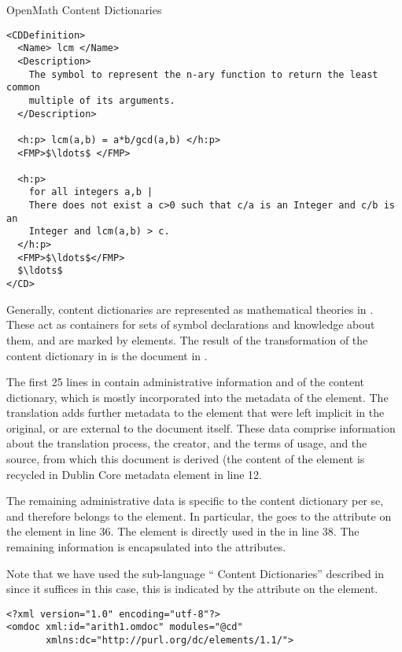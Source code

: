 \begin{omgroup}[id=omcds]{OpenMath Content Dictionaries}
\begin{lstlisting}[language=omCD,label=lst:omcd,mathescape,
    caption={Part of the {\openmath} content dictionary {\snippet{arith1.ocd}}}]
  <CDDefinition>
  <Name> lcm </Name>
  <Description> 
    The symbol to represent the n-ary function to return the least common
    multiple of its arguments.
  </Description>

  <h:p> lcm(a,b) = a*b/gcd(a,b) </h:p>
  <FMP>$\ldots$ </FMP>

  <h:p>
    for all integers a,b |
    There does not exist a c>0 such that c/a is an Integer and c/b is an
    Integer and lcm(a,b) > c.
  </h:p>
  <FMP>$\ldots$</FMP>
  $\ldots$
</CD>
\end{lstlisting}

\noindent Generally, {\openmath} content dictionaries are
represented as mathematical theories in {\omdoc}. These act as
containers for sets of symbol declarations and knowledge about them,
and are marked by {} elements. The result of the
transformation of the content dictionary in {} is the
{\omdoc} document in {}.

The first 25 lines in {} contain administrative information and
{} of the content dictionary, which is mostly incorporated into
the metadata of the {} element. The translation adds further
metadata to the {} element that were left implicit in the original,
or are external to the document itself. These data comprise information about the
translation process, the creator, and the terms of usage, and the source, from
which this document is derived (the content of the {} element is
recycled in Dublin Core metadata element {} in line 12.

The remaining administrative data is specific to the content dictionary per se, and
therefore belongs to the {} element. In particular, the
{} goes to the {} attribute on the
{} element in line 36. The {} element is
directly used in the {} in line 38.  The remaining information is
encapsulated into the {} attributes.

Note that we have used the {\omdoc} sub-language ``{\omdoc} Content Dictionaries''
described in {} since it suffices in this case, this is
indicated by the {} attribute on the {} element.

\begin{lstlisting}[label=lst:omdoccd,escapechar=\|,mathescape,
    caption={The {\openmath} content dictionary {\snippet{arith1}} in {\omdoc} form},
    index={DOCTYPE,omdoc,metadata,dc:title,dc:creator,dc:date,dc:description,dc:source,dc:type,dc:format,theory
           omtext,h:p}]
<?xml version="1.0" encoding="utf-8"?>
<omdoc xml:id="arith1.omdoc" modules="@cd"
       xmlns:dc="http://purl.org/dc/elements/1.1/">


\end{lstlisting}
\end{omgroup}
